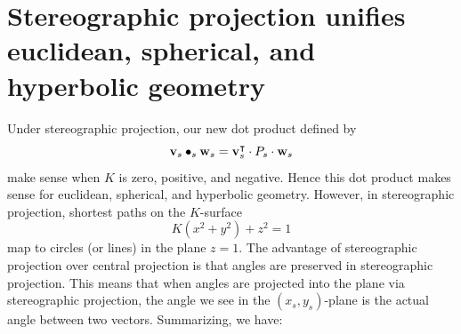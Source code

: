 \documentclass[newpage,hints,handout]{ximera}
\begin{document}
\section{Stereographic projection unifies euclidean, spherical, and hyperbolic geometry}


Under stereographic projection, our new dot product defined by
\[
\mathbf{v}_s\bullet_s \mathbf{w}_s = \mathbf{v}_s^\intercal \cdot P_s \cdot \mathbf{w}_s
\]
make sense when $K$ is zero, positive, and negative. Hence this dot
product makes sense for euclidean, spherical, and hyperbolic
geometry. However, in stereographic projection, shortest paths on the
$K$-surface
\[
K(x^2 + y^2) + z^2 = 1
\]
map to circles (or lines) in the plane $z=1$. The advantage of
stereographic projection over central projection is that angles are
preserved in stereographic projection. This means that when angles are
projected into the plane via stereographic projection, the angle we
see in the $(x_s,y_s)$-plane is the actual angle between two
vectors. Summarizing, we have:
\end{document}
